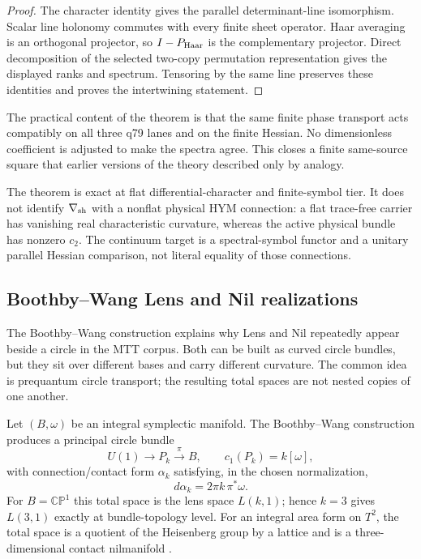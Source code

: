 \documentclass[11pt]{article}
\begin{document}
\begin{proof}
The character identity gives the parallel determinant-line isomorphism.
Scalar line holonomy commutes with every finite sheet operator. Haar averaging
is an orthogonal projector, so $I-P_{\rm Haar}$ is the complementary
projector. Direct decomposition of the selected two-copy permutation
representation gives the displayed ranks and spectrum. Tensoring by the same
line preserves these identities and proves the intertwining statement.
\end{proof}

The practical content of the theorem is that the same finite phase transport
acts compatibly on all three q79 lanes and on the finite Hessian. No
dimensionless coefficient is adjusted to make the spectra agree. This closes
a finite same-source square that earlier versions of the theory described
only by analogy.

The theorem is exact at flat differential-character and finite-symbol tier.
It does not identify $\nabla_{\rm sh}$ with a nonflat physical HYM connection:
a flat trace-free carrier has vanishing real characteristic curvature, whereas
the active physical bundle has nonzero $c_2$. The continuum target is a
spectral-symbol functor and a unitary parallel Hessian comparison, not literal
equality of those connections.

\subsection{Boothby--Wang Lens and Nil realizations}

The Boothby--Wang construction explains why Lens and Nil repeatedly appear
beside a circle in the MTT corpus. Both can be built as curved circle bundles,
but they sit over different bases and carry different curvature. The common
idea is prequantum circle transport; the resulting total spaces are not nested
copies of one another.

Let $(B,\omega)$ be an integral symplectic manifold. The Boothby--Wang
construction produces a principal circle bundle
\[
 U(1)\longrightarrow P_k\xrightarrow{\pi}B,
 \qquad c_1(P_k)=k[\omega],
\]
with connection/contact form $\alpha_k$ satisfying, in the chosen
normalization,
\[
 d\alpha_k=2\pi k\,\pi^*\omega.
\]
For $B=\mathbb{CP}^1$ this total space is the lens space $L(k,1)$; hence
$k=3$ gives $L(3,1)$ exactly at bundle-topology level. For an integral area
form on $T^2$, the total space is a quotient of the Heisenberg group by a
lattice and is a three-dimensional contact nilmanifold
\cite{BoothbyWang,ContactBlowup}.
\end{document}
